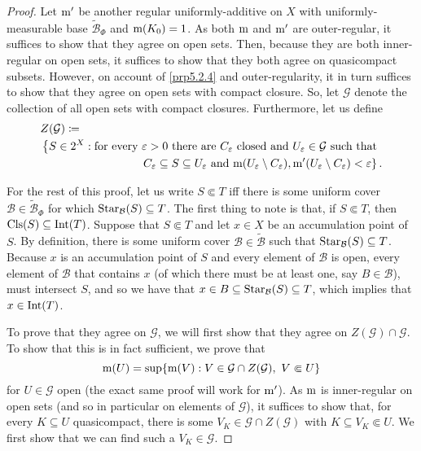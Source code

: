 \begin{thm}
\begin{proof}
Let $\mathrm{m} '$ be another regular uniformly-additive on $X$ with uniformly-measurable base $\widetilde{\mathcal{B}}_\Phi$ and $\mathrm{m} (K_0)=1$.  As both $\mathrm{m}$ and $\mathrm{m} '$ are outer-regular, it suffices to show that they agree on open sets.  Then, because they are both inner-regular on open sets, it suffices to show that they both agree on quasicompact subsets.  However, on account of \cref{prp5.2.4} and outer-regularity, it in turn suffices to show that they agree on open sets with compact closure.  So, let $\mathcal{G}$ denote the collection of all open sets with compact closures.  Furthermore, let us define
\begin{equation}
\begin{multlined}
Z(\mathcal{G})\coloneqq \\ \left\{ S\in 2^X:\text{for every }\varepsilon >0\text{ there are }C_{\varepsilon}\text{ closed and }U_{\varepsilon}\in \mathcal{G}\text{ such that }\right. \\ \left. C_\varepsilon \subseteq S\subseteq U_{\varepsilon}\text{ and }\meas (U_{\varepsilon}\setminus C_{\varepsilon}),\meas '(U_{\varepsilon}\setminus C_{\varepsilon})<\varepsilon \right\} .
\end{multlined}
\end{equation}

For the rest of this proof, let us write $S\Subset T$ iff there is some uniform cover $\mathcal{B}\in \widetilde{\mathcal{B}}_\Phi$ for which $\operatorname{Star} _{\mathcal{B}}(S)\subseteq T$.  The first thing to note is that, if $S\Subset T$, then $\operatorname{Cls} (S)\subseteq \operatorname{Int} (T)$.  Suppose that $S\Subset T$ and let $x\in X$ be an accumulation point of $S$.  By definition, there is some uniform cover $\mathcal{B}\in \widetilde{\mathcal{B}}$ such that $\operatorname{Star} _{\mathcal{B}}(S)\subseteq T$.  Because $x$ is an accumulation point of $S$ and every element of $\mathcal{B}$ is open, every element of $\mathcal{B}$ that contains $x$ (of which there must be at least one, say $B\in \mathcal{B}$), must intersect $S$, and so we have that $x\in B\subseteq \operatorname{Star} _{\mathcal{B}}(S)\subseteq T$, which implies that $x\in \operatorname{Int} (T)$.

To prove that they agree on $\mathcal{G}$, we will first show that they agree on $Z(\mathcal{G})\cap \mathcal{G}$.  To show that this is in fact sufficient, we prove that
\begin{equation}\label{5.1.75}
\meas (U)=\sup \{ \meas (V):V\in \mathcal{G}\cap Z(\mathcal{G}),\ V\Subset U\} 
\end{equation}
for $U\in \mathcal{G}$ open (the exact same proof will work for $\mathrm{m} '$).  As $\mathrm{m}$ is inner-regular on open sets (and so in particular on elements of $\mathcal{G}$), it suffices to show that, for every $K\subseteq U$ quasicompact, there is some $V_K\in \mathcal{G}\cap Z(\mathcal{G})$ with $K\subseteq V_K\Subset U$.  We first show that we can find such a $V_K\in \mathcal{G}$.


\end{proof}
\end{thm}
